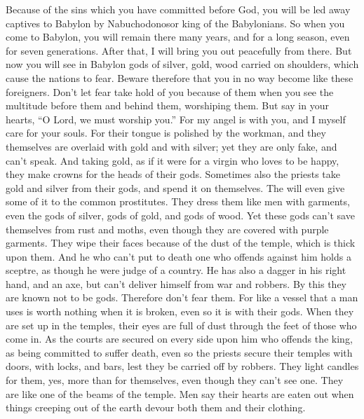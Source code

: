  Because of the sins which you have committed before God,
you will be led away captives to Babylon by Nabuchodonosor king of the
Babylonians.  So when you come to Babylon, you will remain
there many years, and for a long season, even for seven generations.
After that, I will bring you out peacefully from there.  But
now you will see in Babylon gods of silver, gold, wood carried on
shoulders, which cause the nations to fear.  Beware
therefore that you in no way become like these foreigners. Don't let
fear take hold of you because of them when you see the multitude before
them and behind them, worshiping them.  But say in your
hearts, ``O Lord, we must worship you.''  For my angel is
with you, and I myself care for your souls.  For their
tongue is polished by the workman, and they themselves are overlaid with
gold and with silver; yet they are only fake, and can't speak.
 And taking gold, as if it were for a virgin who loves to be
happy, they make crowns for the heads of their gods. 
Sometimes also the priests take gold and silver from their gods, and
spend it on themselves.  The will even give some of it to
the common prostitutes. They dress them like men with garments, even the
gods of silver, gods of gold, and gods of wood.  Yet these
gods can't save themselves from rust and moths, even though they are
covered with purple garments.  They wipe their faces
because of the dust of the temple, which is thick upon them.
 And he who can't put to death one who offends against him
holds a sceptre, as though he were judge of a country.  He
has also a dagger in his right hand, and an axe, but can't deliver
himself from war and robbers.  By this they are known not
to be gods. Therefore don't fear them.  For like a vessel
that a man uses is worth nothing when it is broken, even so it is with
their gods. When they are set up in the temples, their eyes are full of
dust through the feet of those who come in.  As the courts
are secured on every side upon him who offends the king, as being
committed to suffer death, even so the priests secure their temples with
doors, with locks, and bars, lest they be carried off by robbers.
 They light candles for them, yes, more than for
themselves, even though they can't see one.  They are like
one of the beams of the temple. Men say their hearts are eaten out when
things creeping out of the earth devour both them and their clothing.

